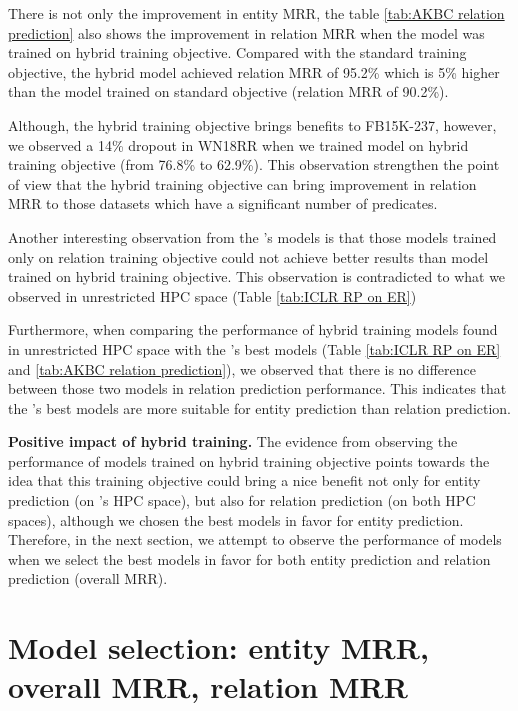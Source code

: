 There is not only the improvement in entity MRR, the table \ref{tab:AKBC relation prediction} also shows the improvement in relation MRR when the model was trained on hybrid training objective. Compared with the standard training objective, the hybrid model achieved relation MRR of 95.2\% which is 5\% higher than the model trained on standard objective (relation MRR of 90.2\%). 

Although, the hybrid training objective brings benefits to FB15K-237, however, we observed a 14\% dropout in WN18RR when we trained model on hybrid training objective (from 76.8\% to 62.9\%). This observation strengthen the point of view that the hybrid training objective can bring improvement in relation MRR to those datasets which have a significant number of predicates.  

Another interesting observation from the \cite{chen2021relation}'s models is that those models trained only on relation training objective could not achieve better results than model trained on hybrid training objective. This observation is contradicted to what we observed in unrestricted HPC space (Table \ref{tab:ICLR RP on ER})

Furthermore, when comparing the performance of hybrid training models found in unrestricted HPC space with the \cite{chen2021relation}'s best models (Table \ref{tab:ICLR RP on ER} and \ref{tab:AKBC relation prediction}), we observed that there is no difference between those two models in relation prediction performance. This indicates that the \cite{chen2021relation}'s best models are more suitable for entity prediction than relation prediction.
\newline




\noindent\textbf{Positive impact of hybrid training.} The evidence from observing the performance of models trained on hybrid training objective points towards the idea that this training objective could bring a nice benefit not only for entity prediction (on \citet{chen2021relation}'s HPC space), but also for relation prediction (on both HPC spaces), although we chosen the best models in favor for entity prediction. Therefore, in the next section, we attempt to observe the performance of models when we select the best models in favor for both entity prediction and relation prediction (overall MRR). 



\section[Model selection]{Model selection: entity MRR, overall MRR, relation MRR}

